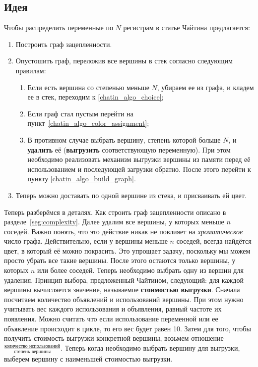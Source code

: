 \subsection{Идея}

Чтобы распределить переменные по $N$ регистрам в статье Чайтина предлагается:

\begin{enumerate}
    \item Построить граф зацепленности.\label{chatin_algo_build_graph}
    \item Опустошить граф, переложив все вершины в стек согласно следующим правилам: \label{chatin_algo_choice}\begin{enumerate}
        \item Если есть вершина со степенью меньше $N$, убираем ее из графа, и кладем ее в стек, переходим
        к \ref{chatin_algo_choice};
        \item Если граф стал пустым перейти на пункт~\ref{chatin_algo_color_assignment};
        \item В противном случае выбрать вершину, степень которой больше $N$, и \textbf{удалить} её (\textbf{выгрузить} соответствующую переменную).
        При этом необходимо реализовать механизм выгрузки вершины из памяти перед её использованием и
        последующей загрузки обратно. После этого перейти к пункту \ref{chatin_algo_build_graph}.
        \label{chatin_algo_spill}
    \end{enumerate}

    \item Теперь можно доставать по одной вершине из стека, и присваивать ей цвет. \label{chatin_algo_color_assignment}
\end{enumerate}

Теперь разберёмся в деталях. Как строить граф зацепленности описано в разделе~\ref{seg:complexity}. Далее удалим все вершины, у
которых меньше $n$ соседей. Важно понять, что это действие никак не повлияет на \textit{хроматическое} число графа. Действительно,
если у вершины меньше $n$ соседей, всегда найдётся цвет, в который её можно покрасить.
 Это упрощает задачу, поскольку мы можем просто убрать все такие вершины.
После этого остаются только вершины, у которых $n$ или более соседей. Теперь необходимо выбрать одну из вершин для удаления. Принцип выбора,
предложенный Чайтином, следующий: для каждой вершины вычисляется значение, называемое \textbf{стоимостью выгрузки}. Сначала посчитаем количество
объявлений и использований вершины. При этом нужно учитывать вес каждого использования и объявления, равный частоте их появления.
Можно считать что если использование переменной или ее объявление происходит в цикле, то его вес будет равен 10.
Затем для того, чтобы получить стоимость выгрузки конкретной вершины, возьмем отношение
$\frac{\textit{количество использований}}{\textit{степень вершины}}$. Теперь когда необходимо выбрать вершину для выгрузки,
выберем вершину с наименьшей стоимостью выгрузки.

